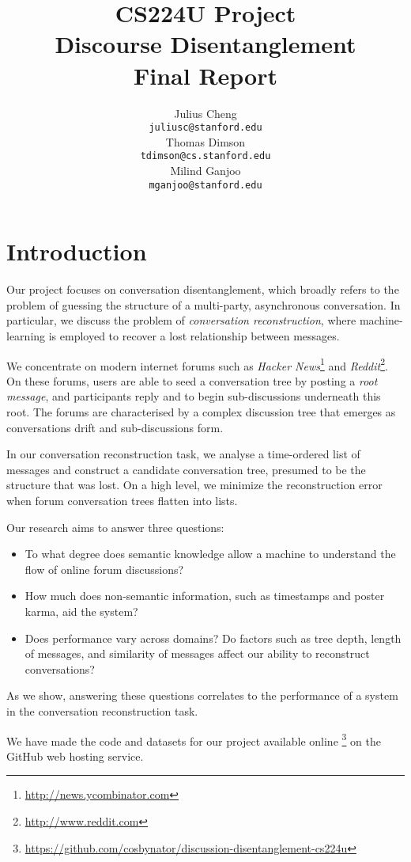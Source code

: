 \documentclass[10pt]{article}
\title{{\small CS224U Project} \\ Discourse Disentanglement \\ \small{Final Report}}
\author{Julius Cheng \\
  {\tt juliusc@stanford.edu}
  \\\And
  Thomas Dimson  \\
  {\tt tdimson@cs.stanford.edu}
  \\\AND
  Milind Ganjoo \\
  {\tt mganjoo@stanford.edu}
}
\date{}
\begin{document}
\maketitle

\section{Introduction}
Our project focuses on conversation disentanglement, which broadly refers to
the problem of guessing the structure of a multi-party, asynchronous
conversation. In particular, we discuss the problem of \textit{conversation
reconstruction}, where machine-learning is employed to recover a lost
relationship between messages.

We concentrate on modern internet forums such as 
\textit{Hacker News}\footnote{\url{http://news.ycombinator.com}} 
and \textit{Reddit}\footnote{\url{http://www.reddit.com}}. 
On these forums, users are able to seed a conversation tree by posting a 
\textit{root message}, and participants reply and to begin sub-discussions 
underneath this root. The forums are characterised by a complex 
discussion tree that emerges as conversations drift and sub-discussions form.

In our conversation reconstruction task, we analyse a time-ordered list
of messages and construct a candidate conversation tree, presumed to be the structure
that was lost. On a high level, we minimize the reconstruction
error when forum conversation trees flatten into lists.

Our research aims to answer three questions:
\begin{itemize}
  \item To what degree does semantic knowledge allow a machine to understand the 
    flow of online forum discussions?
  \item How much does non-semantic information, such as timestamps and poster karma,
    aid the system?
  \item Does performance vary across domains? Do factors such as tree depth,
    length of messages, and similarity of messages affect our ability to
    reconstruct conversations? 
\end{itemize}

As we show, answering these questions correlates to the performance of a system
in the conversation reconstruction task. 

We have made the code and datasets for our project available online
\footnote{\url{https://github.com/cosbynator/discussion-disentanglement-cs224u}} on the
GitHub web hosting service.
\end{document}
